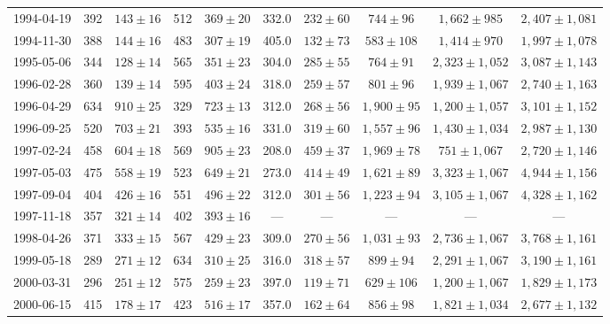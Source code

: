 \begin{landscape}
\begin{longtable}{cccccccccc}
{1994-04-19} & 392 & {$143  \pm  16$} & 512 & {$369 \pm 20$} & 332.0 & {$232 \pm 60$} & {$744 \pm 96$} & {$1,662 \pm 985$} & {$2,407 \pm 1,081$} \\
{1994-11-30} & 388 & {$144  \pm  16$} & 483 & {$307 \pm 19$} & 405.0 & {$132 \pm 73$} & {$583 \pm 108$} & {$1,414 \pm 970$} & {$1,997 \pm 1,078$} \\
{1995-05-06} & 344 & {$128  \pm  14$} & 565 & {$351 \pm 23$} & 304.0 & {$285 \pm 55$} & {$764 \pm 91$} & {$2,323 \pm 1,052$} & {$3,087 \pm 1,143$} \\
{1996-02-28} & 360 & {$139  \pm  14$} & 595 & {$403 \pm 24$} & 318.0 & {$259 \pm 57$} & {$801 \pm 96$} & {$1,939 \pm 1,067$} & {$2,740 \pm 1,163$} \\
{1996-04-29} & 634 & {$910  \pm  25$} & 329 & {$723 \pm 13$} & 312.0 & {$268 \pm 56$} & {$1,900 \pm 95$} & {$1,200 \pm 1,057$} & {$3,101 \pm 1,152$} \\
{1996-09-25} & 520 & {$703  \pm  21$} & 393 & {$535 \pm 16$} & 331.0 & {$319 \pm 60$} & {$1,557 \pm 96$} & {$1,430 \pm 1,034$} & {$2,987 \pm 1,130$} \\
{1997-02-24} & 458 & {$604  \pm  18$} & 569 & {$905 \pm 23$} & 208.0 & {$459 \pm 37$} & {$1,969 \pm 78$} & {$751 \pm 1,067$} & {$2,720 \pm 1,146$} \\
{1997-05-03} & 475 & {$558  \pm  19$} & 523 & {$649 \pm 21$} & 273.0 & {$414 \pm 49$} & {$1,621 \pm 89$} & {$3,323 \pm 1,067$} & {$4,944 \pm 1,156$} \\
{1997-09-04} & 404 & {$426  \pm  16$} & 551 & {$496 \pm 22$} & 312.0 & {$301 \pm 56$} & {$1,223 \pm 94$} & {$3,105 \pm 1,067$} & {$4,328 \pm 1,162$} \\
{1997-11-18} & 357 & {$321  \pm  14$} & 402 & {$393 \pm 16$} & --- & --- & --- & --- & --- \\
{1998-04-26} & 371 & {$333  \pm  15$} & 567 & {$429 \pm 23$} & 309.0 & {$270 \pm 56$} & {$1,031 \pm 93$} & {$2,736 \pm 1,067$} & {$3,768 \pm 1,161$} \\
{1999-05-18} & 289 & {$271  \pm  12$} & 634 & {$310 \pm 25$} & 316.0 & {$318 \pm 57$} & {$899 \pm 94$} & {$2,291 \pm 1,067$} & {$3,190 \pm 1,161$} \\
{2000-03-31} & 296 & {$251  \pm  12$} & 575 & {$259 \pm 23$} & 397.0 & {$119 \pm 71$} & {$629 \pm 106$} & {$1,200 \pm 1,067$} & {$1,829 \pm 1,173$} \\
{2000-06-15} & 415 & {$178  \pm  17$} & 423 & {$516 \pm 17$} & 357.0 & {$162 \pm 64$} & {$856 \pm 98$} & {$1,821 \pm 1,034$} & {$2,677 \pm 1,132$} \\

\end{longtable}
\end{landscape}
